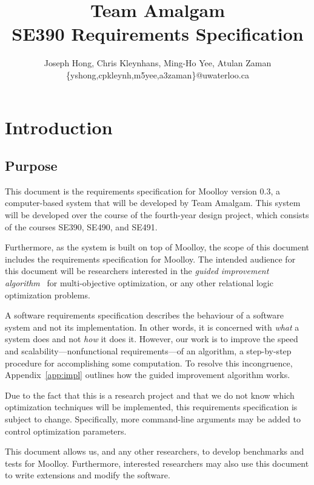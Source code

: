 \documentclass[11pt]{article}
\title{{\Large Team Amalgam} \\ SE390 Requirements Specification}
\author{Joseph Hong, Chris Kleynhans, Ming-Ho Yee, Atulan Zaman \\
        \{yshong,cpkleynh,m5yee,a3zaman\}@uwaterloo.ca}
\theoremstyle{definition}
\begin{document}
\maketitle

\tableofcontents
\newpage

\section{Introduction}\label{sec:intro}
\subsection{Purpose}\label{sec:purpose}

This document is the requirements specification for Moolloy version
0.3, a computer-based system that will be developed by Team Amalgam.
This system will be developed over the course of the fourth-year design
project, which consists of the courses SE390, SE490, and SE491.

Furthermore, as the system is built on top of Moolloy, the scope of
this document includes the requirements specification for Moolloy.
The intended audience for this document will be researchers interested
in the \textit{guided improvement algorithm}~\cite{ref:Rayside09} for
multi-objective optimization, or any other relational logic
optimization problems.

A software requirements specification describes the behaviour of a
software system and not its implementation. In other words, it is
concerned with \textit{what} a system does and not \textit{how} it does
it. However, our work is to improve the speed and
scalability---nonfunctional requirements---of an algorithm, a
step-by-step procedure for accomplishing some computation. To resolve
this incongruence, Appendix~\ref{app:impl} outlines how the guided
improvement algorithm works.

Due to the fact that this is a research project and that we do not know
which optimization techniques will be implemented, this requirements
specification is subject to change. Specifically, more command-line
arguments may be added to control optimization parameters.

This document allows us, and any other researchers, to develop
benchmarks and tests for Moolloy. Furthermore, interested researchers
may also use this document to write extensions and modify the software.
\end{document}
